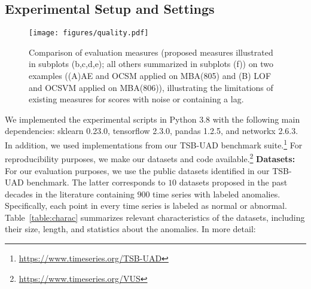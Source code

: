 \subsection{Experimental Setup and Settings}
\label{exp:setup}

\begin{figure*}[tb]
  \centering
  \texttt{[image: figures/quality.pdf]}
  \caption{Comparison of evaluation measures (proposed measures illustrated in subplots (b,c,d,e); all others summarized in subplots (f)) on two examples ((A)AE and OCSM applied on MBA(805) and (B) LOF and OCSVM applied on MBA(806)), illustrating the limitations of existing measures for scores with noise or containing a lag. }
  \label{fig:quality}
\end{figure*}

We implemented the experimental scripts in Python 3.8 with the following main dependencies: sklearn 0.23.0, tensorflow 2.3.0, pandas 1.2.5, and networkx 2.6.3. In addition, we used implementations from our TSB-UAD benchmark suite.\footnote{\scriptsize \url{https://www.timeseries.org/TSB-UAD}} For reproducibility purposes, we make our datasets and code available.\footnote{\scriptsize \url{https://www.timeseries.org/VUS}}
\newline \textbf{Datasets: } For our evaluation purposes, we use the public datasets identified in our TSB-UAD benchmark. The latter corresponds to $10$ datasets proposed in the past decades in the literature containing $900$ time series with labeled anomalies. Specifically, each point in every time series is labeled as normal or abnormal. Table~\ref{table:charac} summarizes relevant characteristics of the datasets, including their size, length, and statistics about the anomalies. In more detail:

